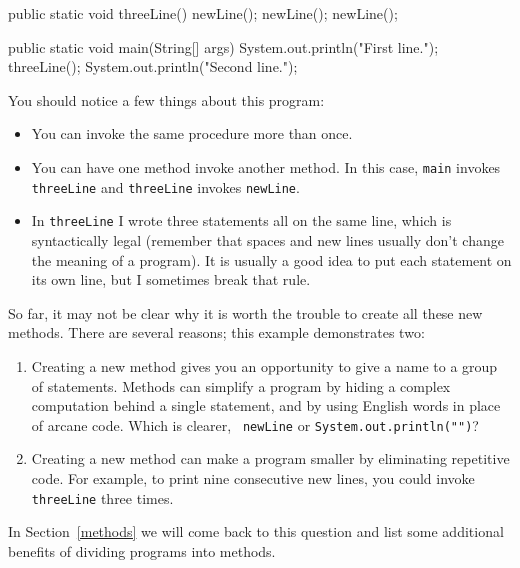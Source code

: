 \documentclass{book}
\begin{document}
\begin{verbatimtab}
  public static void threeLine() {
    newLine();  newLine();  newLine();
  }

  public static void main(String[] args) {
    System.out.println("First line.");
    threeLine();
    System.out.println("Second line.");
  }
\end{verbatimtab}
%
You should notice a few things about this program:

\begin{itemize}

\item You can invoke the same procedure more than once.

\item You can have one method invoke another method.  In this
case, {\tt main} invokes {\tt threeLine} and {\tt threeLine}
invokes {\tt newLine}.

\item In {\tt threeLine} I wrote three statements all on the same
  line, which is syntactically legal (remember that spaces and new
  lines usually don't change the meaning of a program).  It is usually
  a good idea to put each statement on its own line, but I sometimes
  break that rule.

\end{itemize}

So far, it may not be clear why it is worth the trouble to
create all these new methods.  There are several
reasons; this example demonstrates two:

\begin{enumerate}

\item Creating a new method gives you an opportunity to
give a name to a group of statements.  Methods can simplify a program
by hiding a complex computation behind a single statement, and by using
English words in place of arcane code.  Which is clearer, {\tt
newLine} or {\tt System.out.println("")}?

\item Creating a new method can make a program smaller by eliminating
repetitive code.  For example, to print nine consecutive
new lines, you could invoke {\tt threeLine} three times.

\end{enumerate}

In Section~\ref{methods} we will come back to this question and list
some additional benefits of dividing programs into methods.
\end{document}
